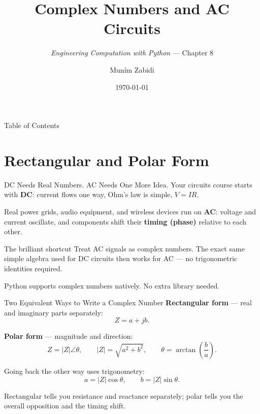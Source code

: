 \documentclass[9pt,aspectratio=169,xcolor=table]{beamer}
\title{Complex Numbers and AC Circuits}
\subtitle{\emph{Engineering Computation with Python} --- Chapter 8}
\author{Mun\'{i}m Zabidi}
\institute{\color{primary}Faculty of Electrical Engineering, Universiti Teknologi Malaysia}
\date{\today}
\begin{document}
\titlepage

\begin{frame}{Table of Contents}
    \tableofcontents
\end{frame}

\section{Rectangular and Polar Form}

\begin{frame}{DC Needs Real Numbers. AC Needs One More Idea.}
    \leavevmode
    Your circuits course starts with \textbf{DC}: current flows one way,
    Ohm's law is simple, $V = IR$.

    \vspace{2mm}
    Real power grids, audio equipment, and wireless devices run on
    \textbf{AC}: voltage and current oscillate, and components shift
    their \textbf{timing (phase)} relative to each other.

    \vspace{3mm}
    \begin{alertblock}{The brilliant shortcut}
        Treat AC signals as \alert{complex numbers}. The exact same
        simple algebra used for DC circuits then works for AC --- no
        trigonometric identities required.
    \end{alertblock}

    \vspace{2mm}
    {\small Python supports complex numbers natively. No extra library
    needed.}
\end{frame}

\begin{frame}{Two Equivalent Ways to Write a Complex Number}
    \leavevmode
    \textbf{Rectangular form} --- real and imaginary parts separately:
    \[
    Z = a + jb.
    \]

    \vspace{2mm}
    \textbf{Polar form} --- magnitude and direction:
    \[
    Z = |Z|\angle\theta, \qquad
    |Z| = \sqrt{a^2 + b^2}, \qquad
    \theta = \arctan\!\left(\frac{b}{a}\right).
    \]

    \vspace{2mm}
    Going back the other way uses trigonometry:
    \[
    a = |Z|\cos\theta, \qquad b = |Z|\sin\theta.
    \]

    \vspace{2mm}
    {\small Rectangular tells you resistance and reactance separately;
    polar tells you the overall opposition and the timing shift.}
\end{frame}
\end{document}
